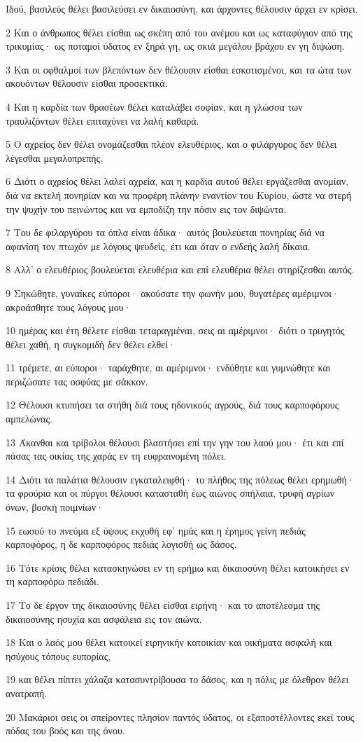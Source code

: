 \par Ιδού, βασιλεύς θέλει βασιλεύσει εν δικαιοσύνη, και άρχοντες θέλουσιν άρχει εν κρίσει.
\par 2 Και ο άνθρωπος θέλει είσθαι ως σκέπη από του ανέμου και ως καταφύγιον από της τρικυμίας· ως ποταμοί ύδατος εν ξηρά γη, ως σκιά μεγάλου βράχου εν γη διψώση.
\par 3 Και οι οφθαλμοί των βλεπόντων δεν θέλουσιν είσθαι εσκοτισμένοι, και τα ώτα των ακουόντων θέλουσιν είσθαι προσεκτικά.
\par 4 Και η καρδία των θρασέων θέλει καταλάβει σοφίαν, και η γλώσσα των τραυλιζόντων θέλει επιταχύνει να λαλή καθαρά.
\par 5 Ο αχρείος δεν θέλει ονομάζεσθαι πλέον ελευθέριος, και ο φιλάργυρος δεν θέλει λέγεσθαι μεγαλοπρεπής.
\par 6 Διότι ο αχρείος θέλει λαλεί αχρεία, και η καρδία αυτού θέλει εργάζεσθαι ανομίαν, διά να εκτελή πονηρίαν και να προφέρη πλάνην εναντίον του Κυρίου, ώστε να στερή την ψυχήν του πεινώντος και να εμποδίζη την πόσιν εις τον διψώντα.
\par 7 Του δε φιλαργύρου τα όπλα είναι άδικα· αυτός βουλεύεται πονηρίας διά να αφανίση τον πτωχόν με λόγους ψευδείς, έτι και όταν ο ενδεής λαλή δίκαια.
\par 8 Αλλ' ο ελευθέριος βουλεύεται ελευθέρια και επί ελευθέρια θέλει στηρίζεσθαι αυτός.
\par 9 Σηκώθητε, γυναίκες εύποροι· ακούσατε την φωνήν μου, θυγατέρες αμέριμνοι· ακροάσθητε τους λόγους μου·
\par 10 ημέρας και έτη θέλετε είσθαι τεταραγμέναι, σεις αι αμέριμνοι· διότι ο τρυγητός θέλει χαθή, η συγκομιδή δεν θέλει ελθεί·
\par 11 τρέμετε, αι εύποροι· ταράχθητε, αι αμέριμνοι· ενδύθητε και γυμνώθητε και περιζώσατε τας οσφύας με σάκκον.
\par 12 Θέλουσι κτυπήσει τα στήθη διά τους ηδονικούς αγρούς, διά τους καρποφόρους αμπελώνας.
\par 13 Άκανθαι και τρίβολοι θέλουσι βλαστήσει επί την γην του λαού μου· έτι και επί πάσας τας οικίας της χαράς εν τη ευφραινομένη πόλει.
\par 14 Διότι τα παλάτια θέλουσιν εγκαταλειφθή· το πλήθος της πόλεως θέλει ερημωθή· τα φρούρια και οι πύργοι θέλουσι κατασταθή έως αιώνος σπήλαια, τρυφή αγρίων όνων, βοσκή ποιμνίων·
\par 15 εωσού το πνεύμα εξ ύψους εκχυθή εφ' ημάς και η έρημος γείνη πεδιάς καρποφόρος, η δε καρποφόρος πεδιάς λογισθή ως δάσος.
\par 16 Τότε κρίσις θέλει κατασκηνώσει εν τη ερήμω και δικαιοσύνη θέλει κατοικήσει εν τη καρποφόρω πεδιάδι.
\par 17 Το δε έργον της δικαιοσύνης θέλει είσθαι ειρήνη· και το αποτέλεσμα της δικαιοσύνης ησυχία και ασφάλεια εις τον αιώνα.
\par 18 Και ο λαός μου θέλει κατοικεί ειρηνικήν κατοικίαν και οικήματα ασφαλή και ησύχους τόπους ευπορίας,
\par 19 και θέλει πίπτει χάλαζα κατασυντρίβουσα το δάσος, και η πόλις με όλεθρον θέλει ανατραπή.
\par 20 Μακάριοι σεις οι σπείροντες πλησίον παντός ύδατος, οι εξαποστέλλοντες εκεί τους πόδας του βοός και της όνου.

